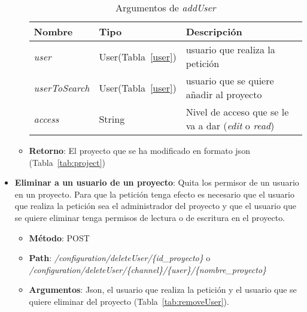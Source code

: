 \begin{itemize}
\begin{itemize}
\begin{table}[h]
		\begin{tabular}{lll}
		\textbf{Nombre}  & \textbf{Tipo} & \textbf{Descripción}                                 \\ \hline \hline
		\textit{user} & User(Tabla~\ref{user}) & usuario que realiza la petición\\
		\textit{userToSearch} & User(Tabla~\ref{user}) & usuario que se quiere añadir al proyecto\\ 
		\textit{access} & String & Nivel de acceso que se le va a dar (\textit{edit} o \textit{read})\\ \hline
		\end{tabular}
		\caption{Argumentos de \textit{addUser}}
		\label{tab:addUser}
		\end{table}
	\item \textbf{Retorno}: El proyecto que se ha modificado en formato json (Tabla~\ref{tab:project})	
	\end{itemize}
\item \textbf{Eliminar a un usuario de un proyecto}: Quita los permisor de un usuario en un proyecto. Para que la petición tenga efecto es necesario que el usuario que realiza la petición sea el administrador del proyecto y que el usuario que se quiere eliminar tenga permisos de lectura o de escritura en el proyecto.
	\begin{itemize}
	\item \textbf{Método}: POST
	\item \textbf{Path}: \textit{/configuration/deleteUser/\{id\_proyecto\}} o\\ \textit{/configuration/deleteUser/\{channel\}/\{user\}/\{nombre\_proyecto\}}
	\item \textbf{Argumentos}: Json, el usuario que realiza la petición y el usuario que se quiere eliminar del proyecto (Tabla~\ref{tab:removeUser}).\\
		\begin{table}[h]
		\centering
		

\end{table}
\end{itemize}
\end{itemize}
